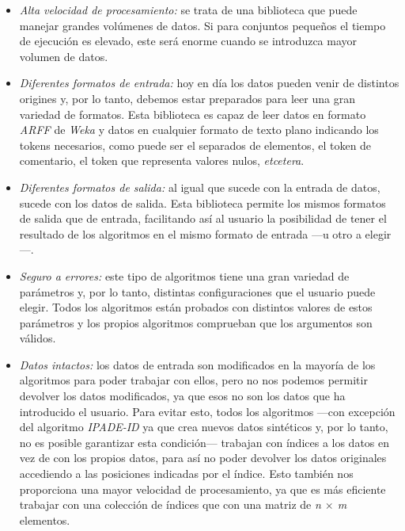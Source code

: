 \begin{itemize}
	\item \textit{Alta velocidad de procesamiento:} se trata de una biblioteca que puede manejar grandes volúmenes de datos. Si para conjuntos pequeños el tiempo de ejecución es elevado, este será enorme cuando se introduzca mayor volumen de datos.
	\item \textit{Diferentes formatos de entrada:} hoy en día los datos pueden venir de distintos origines y, por lo tanto, debemos estar preparados para leer una gran variedad de formatos. Esta biblioteca es capaz de leer datos en formato \textit{ARFF} \cite{arffwiki} de \textit{Weka} \cite{weka} \cite{wekaweb} y datos en cualquier formato de texto plano indicando los tokens necesarios, como puede ser el separados de elementos, el token de comentario, el token que representa valores nulos, \textit{etcetera}.
	\item \textit{Diferentes formatos de salida:} al igual que sucede con la entrada de datos, sucede con los datos de salida. Esta biblioteca permite los mismos formatos de salida que de entrada, facilitando así al usuario la posibilidad de tener el resultado de los algoritmos en el mismo formato de entrada —u otro a elegir—.
	\item \textit{Seguro a errores:} este tipo de algoritmos tiene una gran variedad de parámetros y, por lo tanto, distintas configuraciones que el usuario puede elegir. Todos los algoritmos están probados con distintos valores de estos parámetros y los propios algoritmos comprueban que los argumentos son válidos. 
	\item \textit{Datos intactos:} los datos de entrada son modificados en la mayoría de los algoritmos para poder trabajar con ellos, pero no nos podemos permitir devolver los datos modificados, ya que esos no son los datos que ha introducido el usuario. Para evitar esto, todos los algoritmos —con excepción del algoritmo \textit{IPADE-ID} ya que crea nuevos datos sintéticos y, por lo tanto, no es posible garantizar esta condición— trabajan con índices a los datos en vez de con los propios datos, para así no poder devolver los datos originales accediendo a las posiciones indicadas por el índice. Esto también nos proporciona una mayor velocidad de procesamiento, ya que es más eficiente trabajar con una colección de índices que con una matriz de \textit{n $\times$ m} elementos.
\end{itemize}